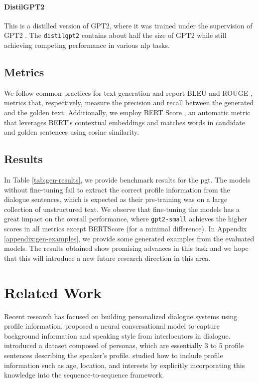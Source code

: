 \documentclass[11pt]{article}
\begin{document}
\paragraph{DistilGPT2} This is a distilled version of GPT2, where it was trained under the supervision of GPT2 \cite{DISTIL}. The \texttt{distilgpt2} contains about half the size of GPT2 while still achieving competing performance in various \gls*{nlp} tasks.


\subsection{Metrics}

We follow common practices for text generation and report BLEU \cite{BLEU} and ROUGE \cite{ROUGE}, metrics that, respectively, measure the precision and recall between the generated and the golden text.
Additionally, we employ BERT Score \cite{BERT-SCORE}, an automatic metric that leverages BERT's \cite{BERT} contextual embeddings and matches words in candidate and golden sentences using cosine similarity.

\subsection{Results}
\label{sec:results}
In Table \ref{tab:gen-results}, we provide benchmark results for the \gls*{pgt}.
The models without fine-tuning fail to extract the correct profile information from the dialogue sentences, which is expected as their pre-training was on a large collection of unstructured text.
We observe that fine-tuning the models has a great impact on the overall performance, where \texttt{gpt2-small} achieves the higher scores in all metrics except BERTScore (for a minimal difference).
In Appendix \ref{appendix:gen-examples}, we provide some generated examples from the evaluated models.
The results obtained show promising advances in this task and we hope that this will introduce a new future research direction in this area.

\section{Related Work}

Recent research has focused on building personalized dialogue systems using profile information.
\citet{PERSONA-NEURAL} proposed a neural conversational model to capture background information and speaking style from interlocutors in dialogue.
\citet{PERSONACHAT} introduced a dataset composed of personas, which are essentially 3 to 5 profile sentences describing the speaker's profile.
\citet{PERSONALIZED-TRAITS} studied how to include profile information such as age, location, and interests by explicitly incorporating this knowledge into the sequence-to-sequence framework.
\end{document}
